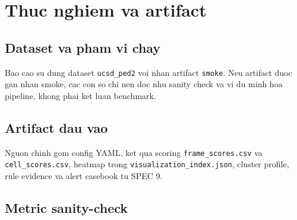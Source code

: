 \chapter{Thuc nghiem va artifact}

\section{Dataset va pham vi chay}

Bao cao su dung dataset \texttt{ucsd\_ped2} voi nhan artifact \texttt{smoke}. Neu artifact duoc gan nhan smoke, cac con so chi nen doc nhu sanity check va vi du minh hoa pipeline, khong phai ket luan benchmark.

\section{Artifact dau vao}

Nguon chinh gom config YAML, ket qua scoring \texttt{frame\_scores.csv} va \texttt{cell\_scores.csv}, heatmap trong \texttt{visualization\_index.json}, cluster profile, rule evidence va alert casebook tu SPEC 9.

\section{Metric sanity-check}


